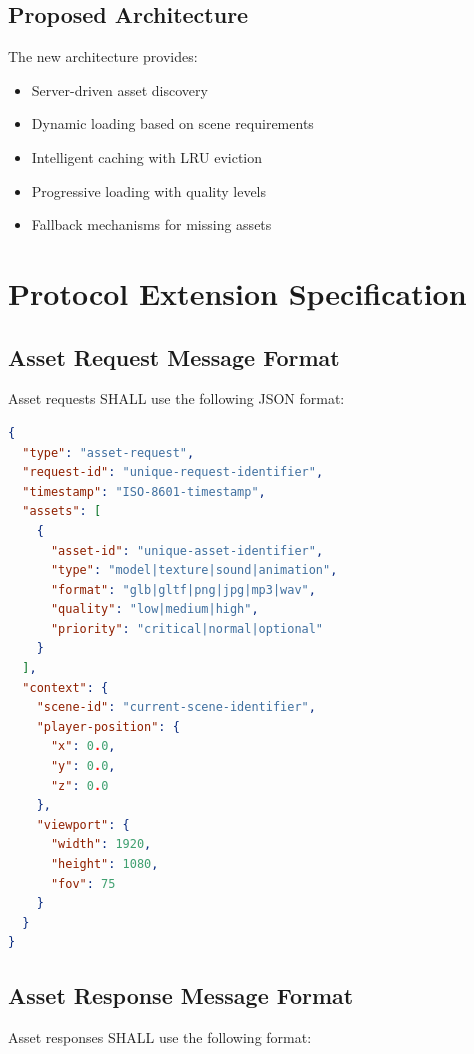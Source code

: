 \documentclass[12pt,a4paper]{article}
\begin{document}
\subsection{Proposed Architecture}

The new architecture provides:

\begin{itemize}
\item Server-driven asset discovery
\item Dynamic loading based on scene requirements
\item Intelligent caching with LRU eviction
\item Progressive loading with quality levels
\item Fallback mechanisms for missing assets
\end{itemize}

\section{Protocol Extension Specification}

\subsection{Asset Request Message Format}

Asset requests SHALL use the following JSON format:

\begin{lstlisting}[language=JSON, caption=Asset Request Message Format]
{
  "type": "asset-request",
  "request-id": "unique-request-identifier",
  "timestamp": "ISO-8601-timestamp",
  "assets": [
    {
      "asset-id": "unique-asset-identifier",
      "type": "model|texture|sound|animation",
      "format": "glb|gltf|png|jpg|mp3|wav",
      "quality": "low|medium|high",
      "priority": "critical|normal|optional"
    }
  ],
  "context": {
    "scene-id": "current-scene-identifier",
    "player-position": {
      "x": 0.0,
      "y": 0.0,
      "z": 0.0
    },
    "viewport": {
      "width": 1920,
      "height": 1080,
      "fov": 75
    }
  }
}
\end{lstlisting}

\subsection{Asset Response Message Format}

Asset responses SHALL use the following format:
\end{document}
